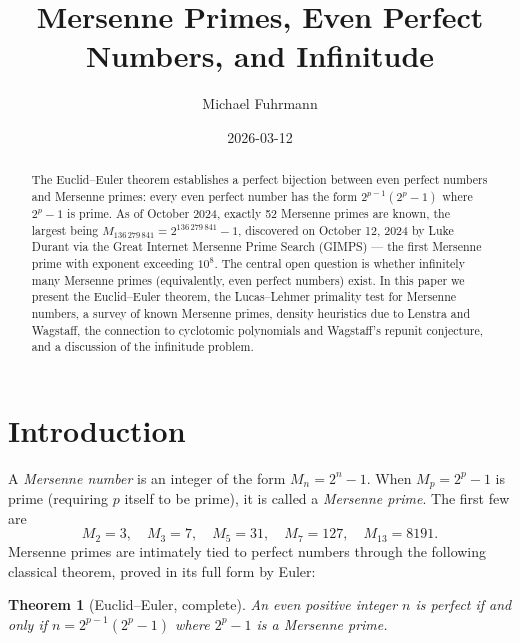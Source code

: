 \documentclass[12pt,a4paper]{amsart}
\newtheorem{theorem}{Theorem}[section]
\theoremstyle{definition}
\theoremstyle{remark}
\begin{document}
\title{Mersenne Primes, Even Perfect Numbers, and Infinitude}

\author{Michael Fuhrmann}
\address{Specialist Mathematics Project, Build 168}
\date{2026-03-12}

\begin{abstract}
The Euclid--Euler theorem establishes a perfect bijection between even perfect
numbers and Mersenne primes: every even perfect number has the form
$2^{p-1}(2^p - 1)$ where $2^p - 1$ is prime.
As of October 2024, exactly 52 Mersenne primes are known, the largest being
$M_{136\,279\,841} = 2^{136\,279\,841} - 1$, discovered on October 12, 2024
by Luke Durant via the Great Internet Mersenne Prime Search (GIMPS) —
the first Mersenne prime with exponent exceeding $10^8$.
The central open question is whether infinitely many Mersenne primes
(equivalently, even perfect numbers) exist.
In this paper we present the Euclid--Euler theorem, the Lucas--Lehmer
primality test for Mersenne numbers, a survey of known Mersenne primes,
density heuristics due to Lenstra and Wagstaff, the connection to cyclotomic
polynomials and Wagstaff's repunit conjecture, and a discussion of the
infinitude problem.
\end{abstract}

\maketitle

\tableofcontents

\section{Introduction}

A \emph{Mersenne number} is an integer of the form $M_n = 2^n - 1$.
When $M_p = 2^p - 1$ is prime (requiring $p$ itself to be prime), it is
called a \emph{Mersenne prime}.
The first few are
\[
  M_2 = 3, \quad M_3 = 7, \quad M_5 = 31, \quad M_7 = 127, \quad
  M_{13} = 8191.
\]
Mersenne primes are intimately tied to perfect numbers through the following
classical theorem, proved in its full form by Euler:

\begin{theorem}[Euclid--Euler, complete]
\label{thm:euclideuler}
An even positive integer $n$ is perfect if and only if
$n = 2^{p-1}(2^p - 1)$ where $2^p - 1$ is a Mersenne prime.
\end{theorem}
\end{document}
